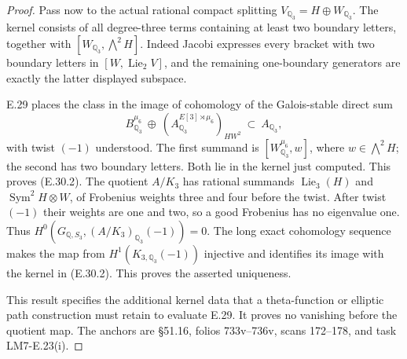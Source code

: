 \documentclass[11pt,oneside]{article}
\begin{document}
\begin{proof}
Pass now to the actual rational compact splitting
$V_{\mathbb Q_3}=H\oplus W_{\mathbb Q_3}$.
The kernel consists of all degree-three terms containing at
least two boundary letters, together with
$[W_{\mathbb Q_3},\bigwedge^2H]$.
Indeed Jacobi expresses every bracket with two boundary letters
in $[W,\operatorname{Lie}_2V]$, and the remaining one-boundary
generators are exactly the latter displayed subspace.

E.29 places the class in the image of cohomology of the
Galois-stable direct sum
\[
 B^{\mu_6}_{\mathbb Q_3}
       \ \oplus\
 (A_{\mathbb Q_3}^{E[3]\rtimes\mu_6})_{HW^2}
       \ \subset\ A_{\mathbb Q_3},
\]
with twist $(-1)$ understood. The first summand is
$[W^{\mu_6}_{\mathbb Q_3},w]$, where
$w\in\bigwedge^2H$; the second has two boundary letters.
Both lie in the kernel just computed. This proves (E.30.2).
The quotient $A/K_3$ has rational summands
$\operatorname{Lie}_3(H)$ and
$\operatorname{Sym}^2H\otimes W$, of Frobenius weights
three and four before the twist. After twist $(-1)$ their
weights are one and two, so a good Frobenius has no eigenvalue
one. Thus $H^0(G_{\mathbb Q,S_3},(A/K_3)_{\mathbb Q_3}(-1))=0$.
The long exact cohomology sequence makes the map from
$H^1(K_{3,\mathbb Q_3}(-1))$ injective and identifies its image
with the kernel in (E.30.2). This proves the asserted uniqueness.

This result specifies the additional kernel data that a
theta-function or elliptic path construction must retain to
evaluate E.29. It proves no vanishing before the quotient map.
The anchors are \S51.16, folios 733v--736v, scans 172--178,
and task LM7-E.23(i).
\end{proof}
\end{document}
